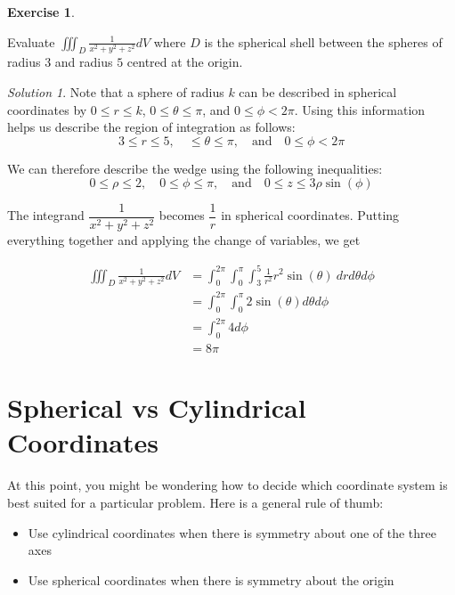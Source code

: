 \documentclass[
]{book}
\providecommand{\tightlist}{%
  \setlength{\itemsep}{0pt}\setlength{\parskip}{0pt}}
\theoremstyle{definition}
\theoremstyle{definition}
\theoremstyle{definition}
\newtheorem{exercise}{Exercise}[chapter]
\theoremstyle{definition}
\theoremstyle{remark}
\newtheorem*{solution}{Solution}
\begin{document}
\begin{exercise}
\protect\hypertarget{exr:unlabeled-div-128}{}\label{exr:unlabeled-div-128}

Evaluate \(\displaystyle \iiint_D \frac{1}{x^2+y^2+z^2}dV\) where \(D\) is the spherical shell between the spheres of radius \(3\) and radius \(5\) centred at the origin.

\end{exercise}

\begin{solution}

Note that a sphere of radius \(k\) can be described in spherical coordinates by \(0\leq r\leq k\), \(0\leq \theta \leq \pi\), and \(0\leq \phi < 2\pi\). Using this information helps us describe the region of integration as follows: \[3\leq r\leq 5, \quad \leq \theta \leq \pi, \quad \mbox{and} \quad 0\leq \phi < 2\pi\]

We can therefore describe the wedge using the following inequalities: \[0\leq \rho\leq 2, \quad 0\leq \phi\leq \pi,\quad \mbox{and}\quad 0\leq z \leq 3\rho\sin(\phi)\]

The integrand \(\dfrac{1}{x^2+y^2+z^2}\) becomes \(\dfrac{1}{r}\) in spherical coordinates. Putting everything together and applying the change of variables, we get

\begin{align*}
\iiint_D \frac{1}{x^2+y^2+z^2}dV & = \int_0^{2\pi}\int_0^{\pi}\int_3^5 \frac{1}{r^2}r^2\sin(\theta)~dr d\theta d\phi \\
& =  \int_0^{2\pi}\int_0^{\pi} 2\sin(\theta) d\theta d\phi \\
&=  \int_0^{2\pi} 4 d\phi\\
& = 8\pi
\end{align*}

\end{solution}

\hypertarget{spherical-vs-cylindrical-coordinates}{%
\section{Spherical vs Cylindrical Coordinates}\label{spherical-vs-cylindrical-coordinates}}

At this point, you might be wondering how to decide which coordinate system is best suited for a particular problem. Here is a general rule of thumb:

\begin{itemize}
\tightlist
\item
  Use cylindrical coordinates when there is symmetry about one of the three axes
\item
  Use spherical coordinates when there is symmetry about the origin
\end{itemize}
\end{document}
